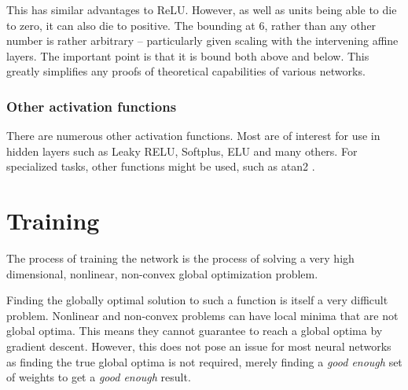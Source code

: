 \documentclass[12pt,parskip]{komatufte}
\begin{document}
This has similar advantages to ReLU.
However, as well as units being able to die to zero, it can also die to positive.
The bounding at 6, rather than any other number is rather arbitrary -- particularly given scaling with the intervening affine layers.
The important point is that it is bound both above and below.
This greatly simplifies any proofs of theoretical capabilities of various networks.



\subsubsection{Other activation functions}

There are numerous other activation functions.
Most are of interest for use in hidden layers such as Leaky RELU, Softplus, ELU and many others.
For specialized tasks, other functions might be used, such as atan2 .


\section{Training}
The process of training the network is the process of solving a very high dimensional, nonlinear, non-convex global optimization problem.


Finding the globally optimal solution to such a function is itself a very difficult problem.
Nonlinear and non-convex problems can have local minima that are not global optima.
This means they cannot guarantee to reach a global optima by gradient descent.
However, this does not pose an issue for most neural networks as finding the true global optima is not required, merely finding a \emph{good enough} set of weights to get a \emph{good enough} result.
\end{document}
